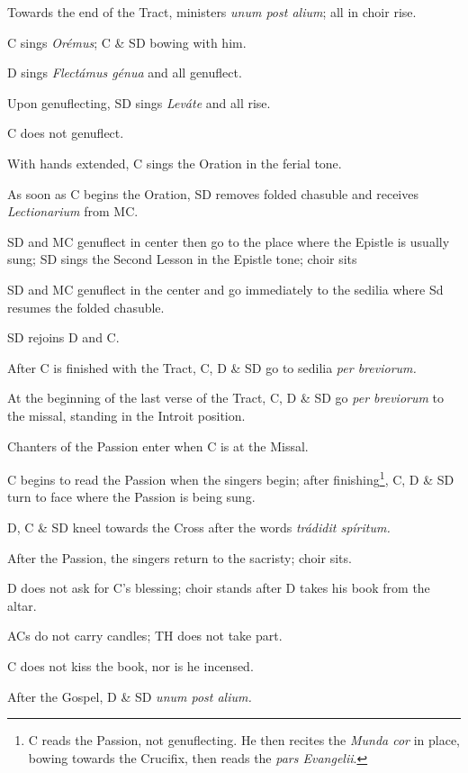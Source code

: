 {\rubric Towards the end of the Tract, ministers \textit{unum post alium}; all
in choir rise.

\rubric C sings \textit{Orémus}; C \& SD bowing with him.

\rubric D sings \textit{Flectámus génua} and all genuflect.

\rubric Upon genuflecting, SD sings \textit{Leváte} and all rise.

\rubric C does not genuflect.

\rubric With hands extended, C sings the Oration in the ferial tone.

\rubric As soon as C begins the Oration, SD removes folded chasuble and
receives \textit{Lectionarium} from MC.

\rubric SD and MC genuflect in center then go to the place where the Epistle is
usually sung; SD sings the Second Lesson in the Epistle tone; choir sits

\rubric SD and MC genuflect in the center and go immediately to the sedilia
where Sd resumes the folded chasuble.

\rubric SD rejoins D and C.

\rubric After C is finished with the Tract, C, D \& SD go to sedilia
\textit{per breviorum.}

\rubric At the beginning of the last verse of the Tract, C, D \& SD go
\textit{per breviorum} to the missal, standing in the Introit position.

\rubric Chanters of the Passion enter when C is at the Missal.

\rubric C begins to read the Passion when the singers begin; after
finishing\footnote{C reads the Passion, not genuflecting. He then recites the
\textit{Munda cor} in place, bowing towards the Crucifix, then reads the
\textit{pars Evangelii}.}, C, D \& SD turn to face where the Passion is being
sung.

\rubric D, C \& SD kneel towards the Cross after the words \textit{trádidit
spíritum.}

\rubric After the Passion, the singers return to the sacristy; choir sits.

\rubric D does not ask for C's blessing; choir stands after D takes his book
from the altar.

\rubric ACs do not carry candles; TH does not take part.

\rubric C does not kiss the book, nor is he incensed.

\rubric After the Gospel, D \& SD \textit{unum post alium.}

}
